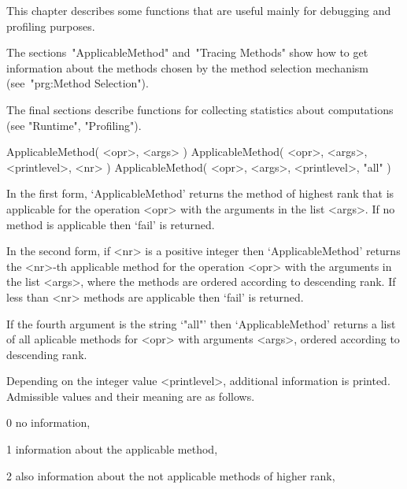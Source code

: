 

This chapter describes some functions that are useful mainly for
debugging and profiling purposes.

The sections~"ApplicableMethod" and~"Tracing Methods" show how to get
information about the methods chosen by the method selection mechanism
(see~"prg:Method Selection").

The final sections describe functions for collecting statistics about
computations (see "Runtime", "Profiling").



\>ApplicableMethod( <opr>, <args> )
\)ApplicableMethod( <opr>, <args>, <printlevel>, <nr> )
\)ApplicableMethod( <opr>, <args>, <printlevel>, "all" )

In the first form, `ApplicableMethod' returns the method of highest rank
that is applicable for the operation <opr> with the arguments in the list
<args>.
If no method is applicable then `fail' is returned.

In the second form, if <nr> is a positive integer then `ApplicableMethod'
returns the <nr>-th applicable method for the operation <opr> with the
arguments in the list <args>,
where the methods are ordered according to descending rank.
If less than <nr> methods are applicable then `fail' is returned.

If the fourth argument is the string `"all"' then `ApplicableMethod'
returns a list of all aplicable methods for <opr> with arguments <args>,
ordered according to descending rank.

Depending on the integer value <printlevel>,
additional information is printed.
Admissible values and their meaning are as follows.

\beginlist
\item{0}
    no information,

\item{1}
    information about the applicable method,

\item{2}
    also information about the not applicable methods of higher rank,

